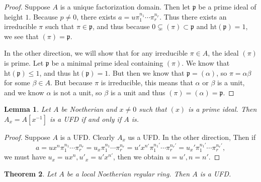 \documentclass[leqno, openany]{memoir}
\newtheorem{thm}{Theorem}[section]
\newtheorem{lem}[thm]{Lemma}
\theoremstyle{definition}
\theoremstyle{remark}
\theoremstyle{plain}
\theoremstyle{definition}
\theoremstyle{remark}
\newcommand{\mf}[1]{\mathfrak{#1}}
\newcommand{\mr}[1]{\mathrm{#1}}
\begin{document}
\begin{proof}
    Suppose $A$ is a unique factorization domain. Then let $\mf{p}$ be a prime ideal of height $1$. Because $p \neq 0$, there exists $a = u \pi_1^{n_1} \cdots \pi_r^{n_r}$. Thus there exists an irreducible $\pi$ such that $\pi \in \mf{p}$, and thus because $0 \subsetneq (\pi) \subset \mf{p}$ and $\mr{ht}(\mf{p}) = 1$, we see that $(\pi) = \mf{p}$.

    In the other direction, we will show that for any irreducible $\pi \in A$, the ideal $(\pi)$ is prime. Let $\mf{p}$ be a minimal prime ideal containing $(\pi)$. We know that $\mr{ht}(\mf{p}) \leq 1$, and thus $\mr{ht}(\mf{p}) = 1$. But then we know that $\mf{p} = (\alpha)$, so $\pi = \alpha \beta$ for some $\beta \in A$. But because $\pi$ is irreducible, this means that $\alpha$ or $\beta$ is a unit, and we know $\alpha$ is not a unit, so $\beta$ is a unit and thus $(\pi) = (\alpha) = \mf{p}$.
\end{proof}

\begin{lem}
    Let $A$ be Noetherian and $x \neq 0$ such that $(x)$ is a prime ideal. Then $A_x = A[x^{-1}]$ is a UFD if and only if $A$ is.
\end{lem}

\begin{proof}
    Suppose $A$ is a UFD. Clearly $A_x$ us a UFD. In the other direction, Then if 
    \[ a = u x^n \pi_1^{n_1} \cdots \pi_r^{n_r} = u_x \pi_1^{n_1} \cdots \pi_r^{n_r} = u' x^{n'} \pi_1^{n_1'} \cdots \pi_r^{n_r'} = u_x' \pi_1^{n_1'} \cdots \pi_r^{n_r'}, \]
    we must have $u_x = u x^n, u'_x = u' x^{n'}$, then we obtain $u = u', n = n'$.
\end{proof}

\begin{thm}
    Let $A$ be a local Noetherian regular ring. Then $A$ is a UFD.
\end{thm}
\end{document}
